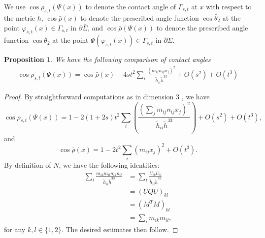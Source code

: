 \documentclass[11pt,letterpaper]{amsart}
\newtheorem{prop}{Proposition}[section]
\begin{document}
We use $\cos\rho_{s,t}(\Psi(x))$ to denote the contact angle of $\Gamma_{s,t}$ at $x$ with respect to the metric $\tilde{h}$, $\cos\bar{\rho}(x)$ to denote the prescribed angle function $\cos\bar{\theta}_2$ at the point $\varphi_{s,t}(x)\in \Gamma_{s,t}$ in $\partial\bar{\Sigma}$, and $\cos\bar{\rho}(\Psi(x))$ to denote the prescribed angle function $\cos\bar{\theta}_2$ at the point $\Psi(\varphi_{s,t}(x))\in\Gamma_{s,t}$ in $\partial\Sigma$. 

\begin{prop}
    We have the following comparison of contact angles
    \begin{align}
        \cos\rho_{s,t}(\Psi(x))=\cos\bar{\rho}(x)-4st^2\sum_{i}\frac{(m_{ij}n_{ij}x_j)^2}{\tilde{h}_{ii}\tilde{h}^{33}}+O(s^2)+O(t^3)
    \end{align}
\end{prop}
\begin{proof}
    By straightforward computations as in dimension $3$ \cite{koyao}, we have
    \[
    \cos\rho_{s,t}(\Psi(x))=1-2(1+2s)t^2\sum_{i}\left(\frac{(\sum_jm_{ij}n_{ij}x_j)^2}{\tilde{h}_{ii}\tilde{h}^{33}}\right)+O(s^2)+O(t^3),
    \]
    and
    \[
    \cos\bar{\rho}(x)=1-2t^2\sum_{i}(m_{ij}x_j)^2+O(t^3).
    \]
    By definition of $N$, we have the following identities:
    \begin{align*}
        \sum_i\frac{m_{ik}m_{il}n_{ik}n_{il}}{\tilde{h}_{ii}\tilde{h}^{33}}&=\sum_i\frac{U_{ik}U_{il}}{\tilde{h}_{ii}\tilde{h}^{33}}\\
        &=(UQU)_{kl}\\
        &=(M^TM)_{kl}\\
        &=\sum_{i}m_{ik}m_{il},
    \end{align*}
    for any $k,l\in\{1,2\}$. The desired estimates then follow.
\end{proof}
\end{document}
